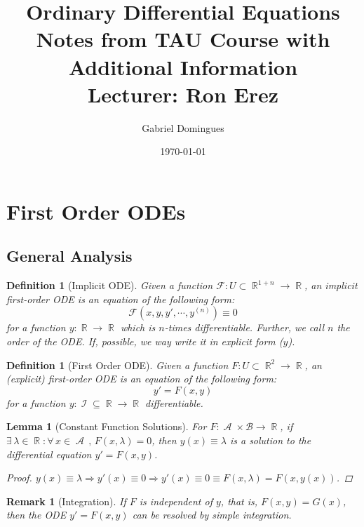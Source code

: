 \documentclass[12pt]{article}
\title{%
  Ordinary Differential Equations \\
  \large Notes from TAU Course with Additional Information \\
  Lecturer: Ron Erez
}
\author{Gabriel Domingues}
\date{\today}
\let\RA\Rightarrow
\newcommand{\Forall}[1]{\forall\,{#1}\,,\,}
\newcommand{\Exist}[1]{\exists\,{#1}:}
\DeclareMathOperator{\R}{\mathbb{R}}
\DeclareMathOperator{\I}{\mathcal{I}}
\DeclareMathOperator{\A}{\mathcal{A}}
\newtheorem{definition}[theorem]{Definition}
\newtheorem{lemma}[theorem]{Lemma}
\newtheorem{remark}[theorem]{Remark}
\begin{document}
\maketitle

\tableofcontents
{}

\doclicenseThis

\pagebreak

\section{First Order ODEs}

\subsection{General Analysis}

\begin{definition}[Implicit ODE]
  Given a function $\mathcal{F}:U\subset \R^{1+n}\to \R$, an implicit first-order ODE is an equation of the following form: $$\mathcal{F}(x,y,y',\cdots, y^{(n)})\equiv 0$$ for a function $y:\R\to\R$ which is $n$-times differentiable. Further, we call $n$ the order of the ODE. If, possible, we way write it in explicit form ($y$).
\end{definition}

\begin{definition}[First Order ODE]
  Given a function $F:U\subset \R^2\to \R$, an (explicit) first-order ODE is an equation of the following form: $$y'=F(x,y)$$ for a function $y:\I\subseteq\R\to\R$ differentiable.
\end{definition}

\begin{lemma}[Constant Function Solutions]
  For $F:\A\times\mathcal{B}\to \R$, if $\Exist{\lambda\in\R}\Forall{x\in \A}F(x,\lambda)=0$, then $y(x)\equiv \lambda$ is a solution to the differential equation $y'=F(x,y)$.
  \begin{proof}
    $y(x)\equiv \lambda\RA y'(x)\equiv 0\RA y'(x)\equiv 0\equiv F(x,\lambda)= F(x,y(x))$.
  \end{proof}
\end{lemma}

\begin{remark}[Integration]
  \label{integration}
  If $F$ is independent of $y$, that is, $F(x,y)=G(x)$, then the ODE $y'=F(x,y)$ can be resolved by simple integration.
\end{remark}
\end{document}
